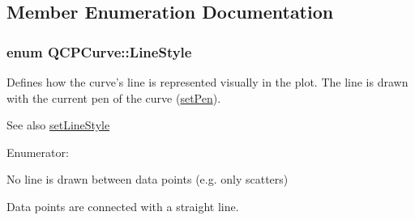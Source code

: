 \subsection{\-Member \-Enumeration \-Documentation}
\hypertarget{classQCPCurve_a2710e9f79302152cff794c6e16cc01f1}{
\subsubsection[{\-Line\-Style}]{\setlength{\rightskip}{0pt plus 5cm}enum {\bf \-Q\-C\-P\-Curve\-::\-Line\-Style}}}\label{classQCPCurve_a2710e9f79302152cff794c6e16cc01f1}
\-Defines how the curve's line is represented visually in the plot. \-The line is drawn with the current pen of the curve (\hyperlink{classQCPAbstractPlottable_ab74b09ae4c0e7e13142fe4b5bf46cac7}{set\-Pen}). \begin{DoxySeeAlso}{\-See also}
\hyperlink{classQCPCurve_a4a377ec863ff81a1875c3094a6177c19}{set\-Line\-Style} 
\end{DoxySeeAlso}
\begin{Desc}
\item[\-Enumerator\-: ]\par
\begin{description}
\item[{\em 
\hypertarget{classQCPCurve_a2710e9f79302152cff794c6e16cc01f1aec1601a191cdf0b4e761c4c66092cc48}{ls\-None}\label{classQCPCurve_a2710e9f79302152cff794c6e16cc01f1aec1601a191cdf0b4e761c4c66092cc48}
}]\-No line is drawn between data points (e.\-g. only scatters) \item[{\em 
\hypertarget{classQCPCurve_a2710e9f79302152cff794c6e16cc01f1ade5822ce6fbf131d3df131795c2e1003}{ls\-Line}\label{classQCPCurve_a2710e9f79302152cff794c6e16cc01f1ade5822ce6fbf131d3df131795c2e1003}
}]\-Data points are connected with a straight line. \end{description}
\end{Desc}




